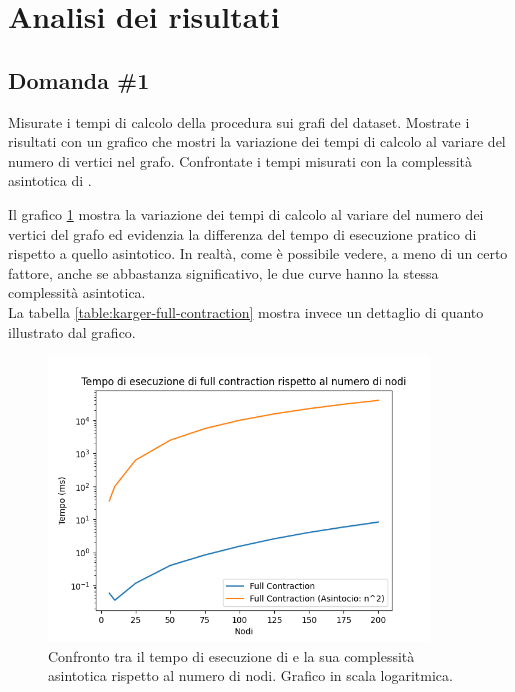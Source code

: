 \section{Analisi dei risultati}
\label{cap:performance-analysis}

\subsection{Domanda \#1}
\label{sec:question-1}

\begin{displayquote}
Misurate i tempi di calcolo della procedura
 sui grafi del dataset. Mostrate i
risultati con un grafico che mostri la variazione dei tempi di calcolo
al variare del numero di vertici nel grafo. Confrontate i tempi
misurati con la complessità asintotica di
.
\end{displayquote}

\noindent Il grafico \ref{fig:karger-full-contraction-chart} mostra la
variazione dei tempi di calcolo al variare del numero dei vertici del
grafo ed evidenzia la differenza del tempo di esecuzione pratico di
 rispetto a quello asintotico. In
realtà, come è possibile vedere, a meno di un certo fattore, anche se
abbastanza significativo, le due curve hanno la stessa complessità
asintotica.\\

\noindent La tabella \ref{table:karger-full-contraction} mostra invece
un dettaglio di quanto illustrato dal grafico.

\begin{figure}[H]
    \centering

    \includegraphics[width=0.9\textwidth]{./images/Tempo_di_esecuzione_di_full_contraction_rispetto_al_numero_di_nodi.png}

    \caption{Confronto tra il tempo di esecuzione di  e la sua complessità asintotica rispetto al numero di nodi. Grafico in scala logaritmica.}
    \label{fig:karger-full-contraction-chart}
\end{figure}

